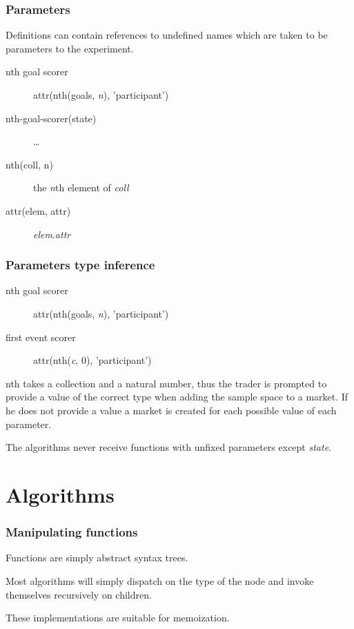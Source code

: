 \documentclass{beamer}
\begin{document}
\begin{frame}
\frametitle{Parameters}
Definitions can contain references to undefined names which are taken to be
parameters to the experiment.

\begin{description}
\item[nth goal scorer] attr(nth(goals, \emph{n}), 'participant')
\item[nth-goal-scorer(state)] \ldots
\end{description}

\begin{description}
\item[nth(coll, n)] the \emph{n}th element of \emph{coll}
\item[attr(elem, attr)] \emph{elem}.\emph{attr}
\end{description}
\end{frame}

\begin{frame}
\frametitle{Parameters type inference}
\begin{description}
\item[nth goal scorer] attr(nth(goals, \emph{n}), 'participant')
\item[first event scorer] attr(nth(\emph{c}, 0), 'participant')
\end{description}

nth takes a collection and a natural number, thus the trader is prompted to
provide a value of the correct type when adding the sample space to a market.
If he does not provide a value a market is created for each possible value of
each parameter.

The algorithms never receive functions with unfixed parameters except
\emph{state}.
\end{frame}

\section{Algorithms}
\begin{frame}
\frametitle{Manipulating functions}
Functions are simply abstract syntax trees.

Most algorithms will simply dispatch on the type of the node and invoke
themselves recursively on children.

These implementations are suitable for memoization.
\end{frame}
\end{document}
